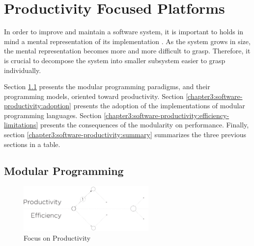 \section{Productivity Focused Platforms} \label{chapter3:software-productivity}


In order to improve and maintain a software system, it is important to holds in mind a mental representation of its implementation \cite{Simon1962}.
As the system grows in size, the mental representation becomes more and more difficult to grasp.
Therefore, it is crucial to decompose the system into smaller subsystem easier to grasp individually.


Section \ref{chapter3:software-productivity:modularity} presents the modular programming paradigms, and their programming models, oriented toward productivity.
Section \ref{chapter3:software-productivity:adoption} presents the adoption of the implementations of modular programming languages.
Section \ref{chapter3:software-productivity:efficiency-limitations} presents the consequences of the modularity on performance.
Finally, section \ref{chapter3:software-productivity:summary} summarizes the three previous sections in a table.

\subsection{Modular Programming} \label{chapter3:software-productivity:modularity}

\begin{figure}[!h]
\begin{center}
\includegraphics[width=0.6\textwidth]{../resources/state-of-the-art-1.pdf}
\end{center}
\caption{Focus on Productivity}
\label{fig:state-of-the-art-1}
\end{figure}

